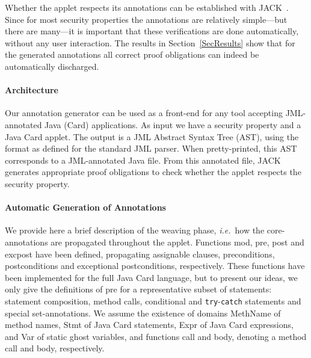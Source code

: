 Whether the applet respects its annotations can be established with
JACK~\cite{BRL-JACK}. Since for most security properties the
annotations are relatively simple---but there are many---it is
important that these verifications are done automatically, without any
user interaction. The results in Section~\ref{SecResults} show that
for the generated annotations all correct proof obligations can indeed
be automatically discharged.

\paragraph*{Architecture}




Our annotation generator
can be used as a front-end for any tool accepting JML-annotated Java
(Card) applications. As input we have a security property and a Java
Card applet. The output is a JML Abstract Syntax Tree (AST), using the
format as defined for the standard JML parser. When pretty-printed,
this AST corresponds to a JML-annotated Java file. From this
annotated file, JACK generates appropriate proof obligations to check
whether the applet respects the security property.

\paragraph*{Automatic Generation of Annotations}
We provide here a brief description of the
weaving phase, \emph{i.e.}~how the core-annotations are propagated
throughout the applet. Functions \textsf{mod}, \textsf{pre},
\textsf{post} and \textsf{exc\-post} have been defined, propagating assignable clauses,
preconditions, postconditions and exceptional postconditions,
respectively. These functions have been implemented for
the full Java Card language, but to present our ideas, we only give
the definitions of  \textsf{pre} for a representative subset of statements: statement
composition, method calls, conditional and \texttt{try}-\texttt{catch}
statements and special set-annotations. We assume the existence of
domains \textsf{MethName} of method names, \textsf{Stmt} of Java Card
statements, \textsf{Expr} of Java Card expressions, and \textsf{Var}
of static ghost variables, and functions \textsf{call} and
\textsf{body}, denoting a method call and body, respectively.

